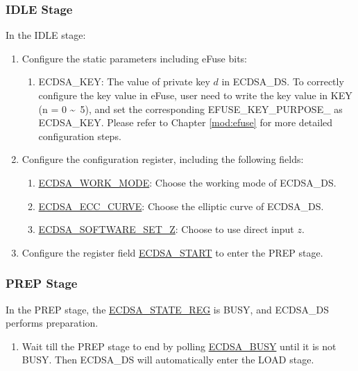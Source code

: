 \documentclass[main\_\_EN.tex]{subfiles}
\begin{document}
\subsubsection{IDLE Stage}
In the IDLE stage:
\begin{enumerate}
	\item Configure the static parameters including eFuse bits:
	      \begin{enumerate}
		      \item ECDSA\_KEY: The value of private key $d$ in ECDSA\_DS. To correctly configure the key value in eFuse, user need to write the key value in KEY (n = 0 \textasciitilde \ 5), and set the corresponding EFUSE\_KEY\_PURPOSE\_ as ECDSA\_KEY. Please refer to Chapter \ref{mod:efuse} \textit{} for more detailed configuration steps.
	      \end{enumerate}
	\item Configure the configuration register, including the following fields:
	      \begin{enumerate}
		      \item \hyperref[fielddesc:ECDSAWORKMODE]{ECDSA\_WORK\_MODE}: Choose the working mode of ECDSA\_DS.
		      \item \hyperref[fielddesc:ECDSAECCCURVE]{ECDSA\_ECC\_CURVE}: Choose the elliptic curve of ECDSA\_DS.
		      \item \hyperref[fielddesc:ECDSASOFTWARESETZ]{ECDSA\_SOFTWARE\_SET\_Z}: Choose to use direct input $z$.
	      \end{enumerate}
	\item Configure the register field \hyperref[fielddesc:ECDSASTART]{ECDSA\_START} to enter the PREP stage.
\end{enumerate}

\subsubsection{PREP Stage}

In the PREP stage, the \hyperref[regdesc:ECDSASTATEREG]{ECDSA\_STATE\_REG} is BUSY, and ECDSA\_DS performs preparation.

\begin{enumerate}
    \item Wait till the PREP stage to end by polling \hyperref[fielddesc:ECDSABUSY]{ECDSA\_BUSY} until it is not BUSY. Then ECDSA\_DS will automatically enter the LOAD stage.
\end{enumerate}
\end{document}
